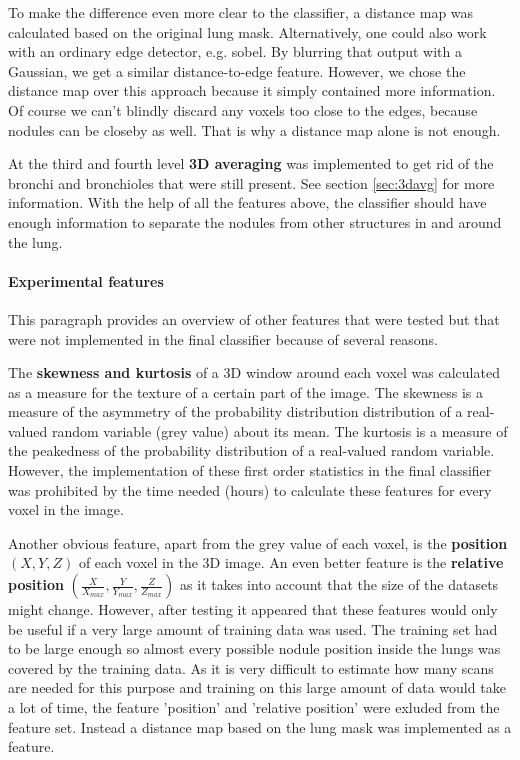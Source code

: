 To make the difference even more clear to the classifier, a distance map was
calculated based on the original lung mask. Alternatively, one could also work
with an ordinary edge detector, e.g. sobel. By blurring that output with a
Gaussian, we get a similar distance-to-edge feature. However, we chose the
distance map over this approach because it simply contained more information. Of
course we can't blindly discard any voxels too close to the edges, because
nodules can be closeby as well. That is why a distance map alone is not enough.

At the third and fourth level \textbf{3D averaging} was implemented to get rid
of the bronchi and bronchioles that were still present. See section
\ref{sec:3davg} for more information. With the help of all the features above,
the classifier should have enough information to separate the nodules from other
structures in and around the lung.

\paragraph{Experimental features}
This paragraph provides an overview of other features that were
tested but that were not implemented in the final classifier because of several
reasons.

The \textbf{skewness and kurtosis} of a 3D window around each
voxel was calculated as a measure for the texture of a certain part of the image. The
skewness is a measure of the asymmetry of the probability distribution
distribution of a real-valued random variable (grey value) about its mean. The
kurtosis is a measure of the peakedness of the probability distribution of a
real-valued random variable. However, the implementation of these first order
statistics in the final classifier was prohibited by the time needed (hours) to
calculate these features for every voxel in the image.

Another obvious feature, apart from the grey value of each voxel, is the
\textbf{position} $(X, Y, Z)$ of each voxel in the 3D image. An even better
feature is the \textbf{relative position} $(\tfrac{X}{X_{max}}, \tfrac{Y}{Y_{max}}, \tfrac{Z}{Z_{max}})$ as
it takes into account that the size of the datasets might change. However, after
testing it appeared that these features would only be useful if a very large
amount of training data was used. The training set had to be large enough so
almost every possible nodule position inside the lungs was covered by the
training data. As it is very difficult to estimate how many scans are needed for
this purpose and training on this large amount of data would take a lot of time,
the feature 'position' and 'relative position' were exluded from the feature set.
Instead a distance map based on the lung mask was implemented as a feature.


